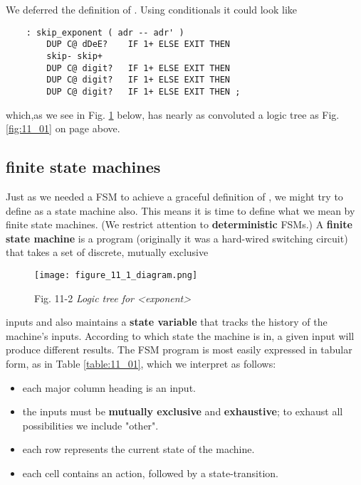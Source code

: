 We deferred the definition of . Using conditionals it could look like

\begin{lstlisting}
    : skip_exponent ( adr -- adr' )
        DUP C@ dDeE?    IF 1+ ELSE EXIT THEN
        skip- skip+
        DUP C@ digit?   IF 1+ ELSE EXIT THEN
        DUP C@ digit?   IF 1+ ELSE EXIT THEN
        DUP C@ digit?   IF 1+ ELSE EXIT THEN ;
\end{lstlisting}

which,as we see in Fig. \ref{fig:11_02} below, has nearly as convoluted a logic tree as Fig. \ref{fig:11_01} on page \pageref{fig:11_01} above.

\subsection{finite state machines}\label{chap:11_02_02}

Just as we needed a FSM to achieve a graceful definition of , we might try to define  as a state machine also. This means it is time to define what we mean by finite state machines. (We restrict attention to \textbf{deterministic} FSMs.) A \textbf{finite state machine} is a program (originally it was a hard-wired switching circuit) that takes a set of discrete, mutually exclusive

\begin{figure}
    \texttt{[image: figure\_11\_1\_diagram.png]}
    \caption{Fig. 11-2 \textit{Logic tree for <exponent>}}
    \label{fig:11_02}
\end{figure}

inputs and also maintains a \textbf{state variable} that tracks the history of the machine's inputs. According to which state the machine is in, a given input will produce different results. The FSM program is most easily expressed in tabular form, as in Table \ref{table:11_01}, which we interpret as follows:

\begin{itemize}
    \item each major column heading is an input.
    \item the inputs must be \textbf{mutually exclusive} and \textbf{exhaustive}; to exhaust all possibilities we include "other".
    \item each row represents the current state of the machine.
    \item each cell contains an action, followed by a state-transition.
\end{itemize}



